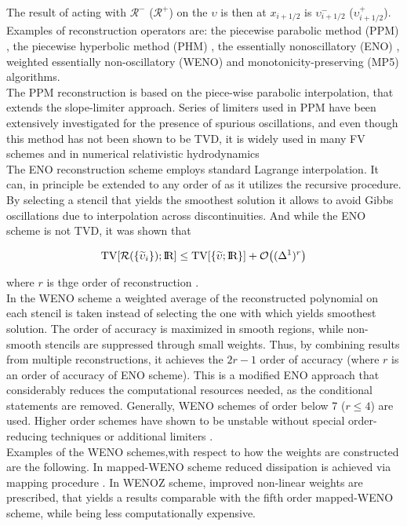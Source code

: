 \documentclass[11pt,a4paper,headinclude=true,DIV=14,BCOR=8mm,chapterprefix,listof=totoc,twoside,openright,abstracton]{scrbook}
\begin{document}
The result of acting with $\mathcal{R}^-$ ($\mathcal{R}^+$) on the $\upsilon$ is then at $x_{i+1/2}$ is $\upsilon^{-}_{i+1/2}$ ($\upsilon^{+}_{i+1/2}$). Examples of reconstruction operators are: the piecewise parabolic method (PPM) \cite{Colella:1984,Colella:2008}, the piecewise hyperbolic method (PHM) \cite{Marquina:1994}, the essentially nonoscillatory (ENO) \cite{Harten:1987,Shu:1988,Shu:1989}, weighted essentially non-oscillatory (WENO) \cite{Liu:1994,Jiang:1996} and monotonicity-preserving (MP5) \cite{Suresh:1997} algorithms. \\
The PPM reconstruction is based on the piece-wise parabolic interpolation, that extends the slope-limiter approach. Series of limiters used in PPM have been extensively investigated for the presence of spurious oscillations, and even though this method has not been shown to be TVD, it is widely used in many FV schemes and in numerical relativistic hydrodynamics \cite{Baiotti:2004wn,Mignone:2005ns}\\
The ENO reconstruction scheme employs standard Lagrange interpolation. It can, in principle  be extended to any order of as it utilizes the recursive procedure. By selecting a stencil that yields the smoothest solution it allows to avoid Gibbs oscillations due to interpolation across discontinuities. And while the ENO scheme is not TVD, it was shown that 

\begin{equation}
    \text{TV}[\mathcal{R}(\{\widetilde{\upsilon}_i\}); \text{I\!R}] \leq \text{TV}[\{\widetilde{\upsilon}; \text{I\!R}\}] + \mathcal{O}\big((\Delta^1)^r\big)
\end{equation}

where $r$ is thge order of reconstruction \cite{Harten:1987}. \\

In the WENO scheme a weighted average of the reconstructed polynomial on each stencil is taken instead of selecting the one with which yields smoothest solution. The order of accuracy is maximized in smooth regions, while non-smooth stencils are suppressed through small weights. Thus, by combining results from multiple reconstructions, it achieves the $2r-1$ order of accuracy (where $r$ is an order of accuracy of ENO scheme). This is a modified ENO approach that considerably reduces the computational resources needed, as the conditional statements are removed. Generally, WENO schemes of order below 7 ($r\leq 4$) are used. Higher order schemes have shown to be unstable without special order-reducing techniques \cite{Gerolymos:2009,Tchekhovskoy:2007zn} or additional limiters \cite{Balsara:2000}.\\
Examples of the WENO schemes,with respect to how the weights are constructed are the following. In mapped-WENO scheme reduced dissipation is achieved via mapping procedure \cite{Henrick:2005}. In WENOZ scheme, improved non-linear weights are prescribed, that yields a results comparable with the fifth order mapped-WENO scheme, while being less computationally expensive. 
\end{document}
